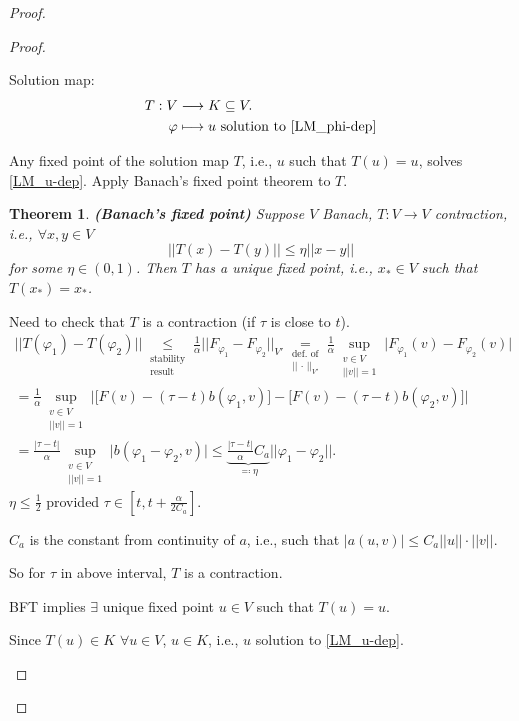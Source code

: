 \documentclass[12pt]{article}
\newtheorem*{theorem*}{Theorem}
\theoremstyle{definition}
\begin{document}
\begin{proof}
\begin{proof}
\begin{enumerate}[label=(\arabic*)]
Solution map:
\begin{align*}
T:V&\longrightarrow K\subseteq V.\\
\varphi&\longmapsto u\text{ solution to \eqref{LM_phi-dep}}
\end{align*}

Any fixed point of the solution map $T$, i.e., $u$ such that $T(u)=u$, solves \eqref{LM_u-dep}. Apply Banach's fixed point theorem to $T$.

\begin{theorem*}
\emph{\textbf{(Banach's fixed point)}} Suppose $V$ Banach, $T:V\rightarrow V$ contraction, i.e., $\forall x,y\in V$
\[\big|\big|T(x)-T(y)\big|\big|\leq\eta||x-y||\]
for some $\eta\in(0,1)$. Then $T$ has a unique fixed point, i.e., $x_*\in V$ such that $T(x_*)=x_*$.
\end{theorem*}

Need to check that $T$ is a contraction (if $\tau$ is close to $t$).
\begin{multline*}
\big|\big|T(\varphi_1)-T(\varphi_2)\big|\big|\underset{\substack{\text{stability}\\\text{result}}}{\leq}\frac{1}{\alpha}||F_{\varphi_1}-F_{\varphi_2}||_{V'}\underset{\substack{\text{def. of}\\||\,\cdot\,||_{V'}}}{=}\frac{1}{\alpha}\sup_{\substack{v\in V\\||v||=1}}\big|F_{\varphi_1}(v)-F_{\varphi_2}(v)\big|\\
=\frac{1}{\alpha}\sup_{\substack{v\in V\\||v||=1}}\Big|\big[F(v)-(\tau-t)b(\varphi_1,v)\big]-\big[F(v)-(\tau-t)b(\varphi_2,v)\big]\Big|\\
=\frac{|\tau-t|}{\alpha}\sup_{\substack{v\in V\\||v||=1}}\big|b(\varphi_1-\varphi_2,v)\big|\leq\underbrace{\frac{|\tau-t|}{\alpha}C_a}_{\eqqcolon\eta}||\varphi_1-\varphi_2||.
\end{multline*}
$\eta\leq\frac{1}{2}$ provided $\tau\in[t,t+\frac{\alpha}{2C_a}]$.

$C_a$ is the constant from continuity of $a$, i.e., such that $|a(u,v)|\leq C_a||u||\cdot||v||$.

So for $\tau$ in above interval, $T$ is a contraction.

BFT implies $\exists$ unique fixed point $u\in V$ such that $T(u)=u$.

Since $T(u)\in K$ $\forall u\in V$, $u\in K$, i.e., $u$ solution to \eqref{LM_u-dep}.
\end{enumerate}
\end{proof}
\end{proof}
\end{document}
